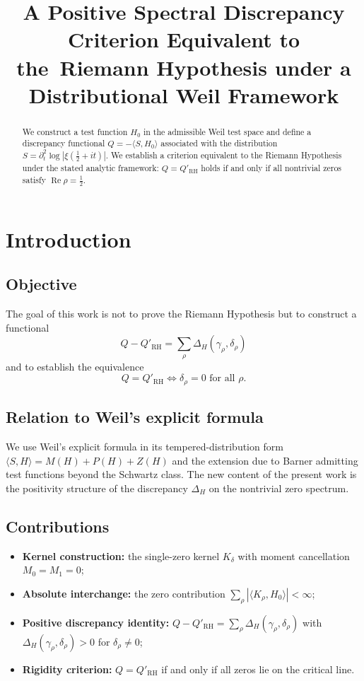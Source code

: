 \documentclass[11pt]{article}
\title{A Positive Spectral Discrepancy Criterion Equivalent to the\
Riemann Hypothesis under a Distributional Weil Framework}
\author{}
\date{}
\begin{document}
\maketitle

\begin{abstract}
We construct a test function $H_0$ in the admissible Weil test space and
define a discrepancy functional $Q=-\langle S,H_0\rangle$ associated with
the distribution $S=\partial_t^2\log|\xi(\tfrac12+it)|$.  We establish a
criterion equivalent to the Riemann Hypothesis under the stated analytic
framework: $Q=Q'_{\mathrm{RH}}$ holds if and only if all nontrivial zeros
satisfy $\operatorname{Re}\rho=\tfrac12$.
\end{abstract}

\section{Introduction}

\subsection{Objective}
The goal of this work is not to prove the Riemann Hypothesis but to
construct a functional
\begin{equation}
Q-Q'_{\mathrm{RH}}=\sum_\rho \Delta_H(\gamma_\rho,\delta_\rho)
\label{eq:objective}
\end{equation}
and to establish the equivalence
\begin{equation}
Q=Q'_{\mathrm{RH}} \iff \delta_\rho=0 \text{ for all } \rho.
\label{eq:equivalence}
\end{equation}

\subsection{Relation to Weil's explicit formula}
We use Weil's explicit formula in its tempered-distribution form
$\langle S,H\rangle=M(H)+P(H)+Z(H)$ and the extension due to Barner
admitting test functions beyond the Schwartz class.  The new content of
the present work is the positivity structure of the discrepancy
$\Delta_H$ on the nontrivial zero spectrum.

\subsection{Contributions}
\begin{itemize}
\item \textbf{Kernel construction:} the single-zero kernel
$K_\delta$ with moment cancellation $M_0=M_1=0$;
\item \textbf{Absolute interchange:} the zero contribution
$\sum_\rho|\langle K_\rho,H_0\rangle|<\infty$;
\item \textbf{Positive discrepancy identity:}
$Q-Q'_{\mathrm{RH}}=\sum_\rho\Delta_H(\gamma_\rho,\delta_\rho)$ with
$\Delta_H(\gamma_\rho,\delta_\rho)>0$ for $\delta_\rho\ne0$;
\item \textbf{Rigidity criterion:}
$Q=Q'_{\mathrm{RH}}$ if and only if all zeros lie on the critical line.
\end{itemize}
\end{document}
